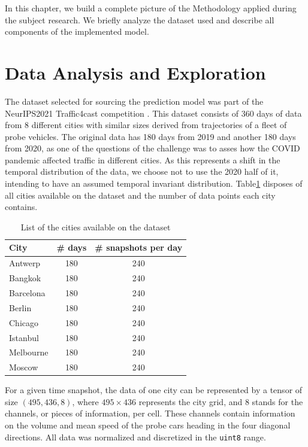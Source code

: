 In this chapter, we build a complete picture of the Methodology applied during the subject research. We briefly analyze the dataset used and describe all components of the implemented model.

\section{Data Analysis and Exploration} \label{sec:data_analysis}

The dataset selected for sourcing the prediction model was part of the NeurIPS2021 Traffic4cast competition \cite{pmlr-v176-eichenberger22a}. This dataset consists of 360 days of data from 8 different cities with similar sizes derived from trajectories of a fleet of probe vehicles. The original data has 180 days from 2019 and another 180 days from 2020, as one of the questions of the challenge was to asses how the COVID pandemic affected traffic in different cities. As this represents a shift in the temporal distribution of the data, we choose not to use the 2020 half of it, intending to have an assumed temporal invariant distribution. Table\ref{tab:cities} disposes of all cities available on the dataset and the number of data points each city contains.

\begin{table}[!h]
\centering
\begin{tabularx}{\textwidth}{Xcc}
\hline
City & \# days & \# snapshots per day \\ \hline
Antwerp & 180 & 240 \\
Bangkok & 180 & 240 \\
Barcelona & 180 & 240 \\
Berlin & 180 & 240 \\
Chicago & 180 & 240 \\
Istanbul & 180 & 240 \\
Melbourne & 180 & 240 \\
Moscow & 180 & 240 \\ \hline
\end{tabularx}
\caption{List of the cities available on the dataset}
\label{tab:cities}
\end{table}

For a given time snapshot, the data of one city can be represented by a tensor of size $(495, 436, 8)$, where $495\times436$ represents the city grid, and $8$ stands for the channels, or pieces of information, per cell. These channels contain information on the volume and mean speed of the probe cars heading in the four diagonal directions. All data was normalized and discretized in the \texttt{uint8} range.

